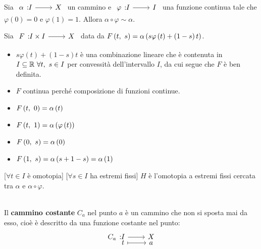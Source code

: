 \begin{lemming}~{}\label{cambiamentodiparametri}\\
	Sia $\funz{\alpha}{I}{X}$ un cammino e $\funz{\varphi}{I}{I}$ una funzione continua tale che $\varphi\left(0\right)=0$ e $\varphi\left(1\right)=1$. Allora $\alpha\circ \varphi\sim\alpha$.
\end{lemming}
\begin{demonstration}
	Sia $\funz{F}{I\times I}{X}$ data da $F\left(t,\ s\right)=\alpha\left(s\varphi\left(t\right)+\left(1-s\right)t\right)$.
	\begin{itemize}
		\item $s\varphi\left(t\right)+\left(1-s\right)t$ è una combinazione lineare che è contenuta in $I\subseteq \mathbb{R}\ \forall t,\ s\in I$ per convessità dell'intervallo $I$, da cui segue che $F$ è ben definita.
		\item $F$ continua perché composizione di funzioni continue.
		\item \parbox[t]{0.38\textwidth}{$F\left(t,\ 0\right)=\alpha\left(t\right)$}
		\item \parbox[t]{0.38\textwidth}{$F\left(t,\ 1\right)=\alpha\left(\varphi\left(t\right)\right)$}
		\item \parbox[t]{0.38\textwidth}{$F\left(0,\ s\right)=\alpha\left(0\right)$}
		\item \parbox[t]{0.38\textwidth}{$F\left(1,\ s\right)=\alpha\left(s+1-s\right)=\alpha\left(1\right)$}
	\end{itemize}
[$\forall t\in I$ è omotopia]
[$\forall s\in I$ ha estremi fissi]
$H$ è l'omotopia a estremi fissi cercata tra $\alpha$ e $\alpha\circ\varphi$.
\end{demonstration}
\begin{define}~{}\\
	Il \textbf{cammino costante} $C_a$ nel punto $a$ è un cammino che non si sposta mai da esso, cioè è descritto da una funzione costante nel punto:
	\begin{equation}
		\funztot{C_a}{I}{X}{t}{a}
	\end{equation}
\vspace{-6mm}
\end{define}
